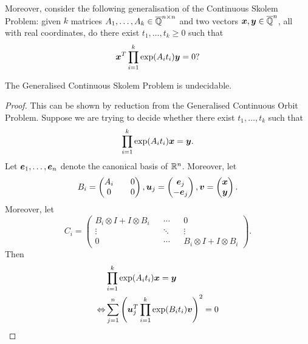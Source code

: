 Moreover, consider the following generalisation of the Continuous Skolem Problem: given $k$ matrices $A_{1}, \ldots, A_{k} \in \overline{\mathbb{Q}}^{n \times n}$ and two vectors $\boldsymbol{x}, \boldsymbol{y} \in \overline{\mathbb{Q}}^{n}$, all with real coordinates, do there exist $t_{1}, \ldots, t_{k} \geq 0$ such that
\begin{equation}
\boldsymbol{x}^{T} \prod \limits_{i=1}^{k} \exp(A_{i} t_{i}) \boldsymbol{y} = 0 ?
\end{equation}

\begin{theorem}
The Generalised Continuous Skolem Problem is undecidable.
\end{theorem}

\begin{proof}
This can be shown by reduction from the Generalised Continuous Orbit Problem. Suppose we are trying to decide whether there exist $t_{1}, \ldots, t_{k}$ such that
\begin{equation*}
\prod \limits_{i=1}^{k} \exp(A_{i} t_{i}) \boldsymbol{x} = \boldsymbol{y} .
\end{equation*}
Let $\boldsymbol{e}_{1}, \ldots, \boldsymbol{e}_{n}$ denote the canonical basis of $\mathbb{R}^{n}$. Moreover, let
\begin{equation*}
B_{i} = \begin{pmatrix} A_{i} && 0 \\ 0 && 0 \end{pmatrix},
\boldsymbol{u}_{j} = \begin{pmatrix} \boldsymbol{e}_{j} \\ - \boldsymbol{e}_{j} \end{pmatrix},
\boldsymbol{v} = \begin{pmatrix} \boldsymbol{x} \\ \boldsymbol{y} \end{pmatrix} .
\end{equation*}
Moreover, let
\begin{equation*}
C_{i} = \begin{pmatrix} B_{i} \otimes I + I \otimes B_{i} && \cdots && 0 \\ \vdots && \ddots && \vdots \\ 0 && \cdots && B_{i} \otimes I + I \otimes B_{i} \end{pmatrix} .
\end{equation*}
Then
\begin{align*}
&\prod \limits_{i=1}^{k} \exp(A_{i} t_{i}) \myvector{x} = \myvector{y} \\
\Leftrightarrow &\sum \limits_{j=1}^{n} \left( \myvector{u}_{j}^{T} \prod \limits_{i=1}^{k} \exp(B_{i} t_{i}) \myvector{v} \right)^{2} = 0 \\

\end{align*}
\end{proof}
